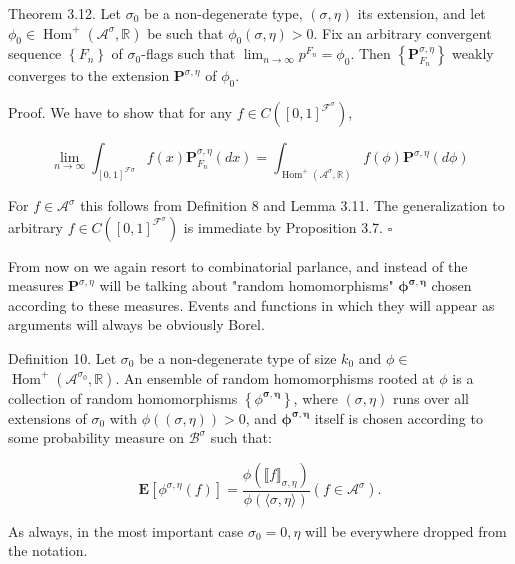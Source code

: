 \documentclass[10pt]{article}
\begin{document}
Theorem 3.12. Let $\sigma_{0}$ be a non-degenerate type, $(\sigma, \eta)$ its extension, and let $\phi_{0} \in \operatorname{Hom}^{+}\left(\mathcal{A}^{\sigma}, \mathbb{R}\right)$ be such that $\phi_{0}(\sigma, \eta)>0$. Fix an arbitrary convergent sequence $\left\{F_{n}\right\}$ of $\sigma_{0}$-flags such that $\lim _{n \rightarrow \infty} p^{F_{n}}=\phi_{0}$. Then $\left\{\mathbf{P}_{F_{n}}^{\sigma, \eta}\right\}$ weakly converges to the extension $\mathbf{P}^{\sigma, \eta}$ of $\phi_{0}$.

Proof. We have to show that for any $f \in C\left([0,1]^{\mathcal{F}^{\sigma}}\right)$,

$$
\lim _{n \rightarrow \infty} \int_{[0,1]^{\mathcal{F} \sigma}} f(x) \mathbf{P}_{F_{n}}^{\sigma, \eta}(d x)=\int_{\operatorname{Hom}^{+}\left(\mathcal{A}^{\sigma}, \mathbb{R}\right)} f(\phi) \mathbf{P}^{\sigma, \eta}(d \phi)
$$

For $f \in \mathcal{A}^{\sigma}$ this follows from Definition 8 and Lemma 3.11. The generalization to arbitrary $f \in C\left([0,1]^{\mathcal{F}^{\sigma}}\right)$ is immediate by Proposition 3.7. \(\square\)

From now on we again resort to combinatorial parlance, and instead of the measures $\mathbf{P}^{\sigma, \eta}$ will be talking about "random homomorphisms" $\boldsymbol{\phi}^{\boldsymbol{\sigma}, \boldsymbol{\eta}}$ chosen according to these measures. Events and functions in which they will appear as arguments will always be obviously Borel.

Definition 10. Let $\sigma_{0}$ be a non-degenerate type of size $k_{0}$ and $\phi \in$ $\operatorname{Hom}^{+}\left(\mathcal{A}^{\sigma_{0}}, \mathbb{R}\right)$. An ensemble of random homomorphisms rooted at $\phi$ is a collection of random homomorphisms $\left\{\phi^{\boldsymbol{\sigma}, \boldsymbol{\eta}}\right\}$, where $(\sigma, \eta)$ runs over all extensions of $\sigma_{0}$ with $\phi((\sigma, \eta))>0$, and $\boldsymbol{\phi}^{\boldsymbol{\sigma}, \boldsymbol{\eta}}$ itself is chosen according to some probability measure on $\mathcal{B}^{\sigma}$ such that:


\begin{equation*}
\mathbf{E}\left[\phi^{\sigma, \eta}(f)\right]=\frac{\phi\left(\llbracket f \rrbracket_{\sigma, \eta}\right)}{\phi(\langle\sigma, \eta\rangle)}\left(f \in \mathcal{A}^{\sigma}\right) . \tag{21}
\end{equation*}


As always, in the most important case $\sigma_{0}=0, \eta$ will be everywhere dropped from the notation.
\end{document}
